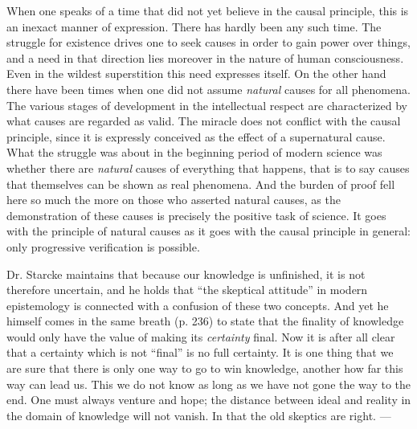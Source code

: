 \documentclass[12pt,a4paper,openany]{book}
\newcommand{\opage}[1]{\marginnote{\footnotesize\textit{[#1]}}}
\begin{document}
When one speaks of a time that did not yet believe in
the causal principle, this is an inexact manner of expression.
There has hardly been any such time. The struggle for
existence drives one to seek causes in order to gain power
over things, and a need in that direction lies moreover in
the nature of human consciousness. Even in the wildest
superstition this need expresses itself. On the other hand there have been
times when one did not assume \emph{natural}
causes for all phenomena. The various stages of development in the intellectual
respect are characterized by what causes are regarded as valid.
\opage{30}The miracle does not conflict with the causal principle, since it is
expressly conceived as the effect of a supernatural cause.
What the struggle was about in the beginning period of modern
science was whether there are \emph{natural} causes of everything that
happens, that is to say causes that themselves can be shown
as real phenomena. And the burden of proof fell here so much
the more on those who asserted natural causes, as
the demonstration of these causes is precisely the positive
task of science. It goes with the principle of natural causes as
it goes with the causal principle in general: only progressive
verification is possible.

Dr. Starcke maintains that because our knowledge is unfinished,
it is not therefore uncertain, and he holds that ``the skeptical
attitude'' in modern epistemology is connected with
a confusion of these two concepts. And yet he himself comes
in the same breath (p. 236) to state that the
finality of knowledge would only have the value of making its \emph{certainty}
final. Now it is after all clear that a certainty which is not
``final'' is no full certainty. It is one thing that we
are sure that there is only one way to go to win
knowledge, another how far this way can lead
us. This we do not know as long as we have not gone the way
to the end. One must always venture and hope; the distance between
ideal and reality in the domain of knowledge will not
vanish. In that the old skeptics are right. ---
\end{document}

